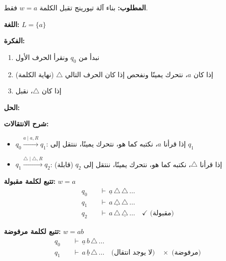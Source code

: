 \documentclass[14pt]{extarticle}
\begin{document}
\textbf{المطلوب:} بناء آلة تيورينج تقبل الكلمة $w = a$ فقط.

\textbf{اللغة:} $L = \{a\}$

\textbf{الفكرة:}
\begin{enumerate}
    \item نبدأ من $q_0$ ونقرأ الحرف الأول
    \item إذا كان $a$، نتحرك يمينًا ونفحص إذا كان الحرف التالي $\triangle$ (نهاية الكلمة)
    \item إذا كان $\triangle$، نقبل
\end{enumerate}

\textbf{الحل:}

\begin{center}
\end{center}

\textbf{شرح الانتقالات:}
\begin{itemize}
    \item $q_0 \xrightarrow{a \mid a, R} q_1$: إذا قرأنا $a$، نكتبه كما هو، نتحرك يمينًا، ننتقل إلى $q_1$
    \item $q_1 \xrightarrow{\triangle \mid \triangle, R} q_2$: إذا قرأنا $\triangle$، نكتبه كما هو، نتحرك يمينًا، ننتقل إلى $q_2$ (قابلة)
\end{itemize}

\textbf{تتبع لكلمة مقبولة:} $w = a$
\begin{align*}
q_0 \quad &\vdash \, \underline{a} \, \triangle \, \triangle \, \ldots \\
q_1 \quad &\vdash \, a \, \underline{\triangle} \, \triangle \, \ldots \\
q_2 \quad &\vdash \, a \, \triangle \, \underline{\triangle} \, \ldots \quad \checkmark \text{ (مقبولة)}
\end{align*}

\textbf{تتبع لكلمة مرفوضة:} $w = ab$
\begin{align*}
q_0 \quad &\vdash \, \underline{a} \, b \, \triangle \, \ldots \\
q_1 \quad &\vdash \, a \, \underline{b} \, \triangle \, \ldots \quad \text{(لا يوجد انتقال)} \quad \times \text{ (مرفوضة)}
\end{align*}
\end{document}
